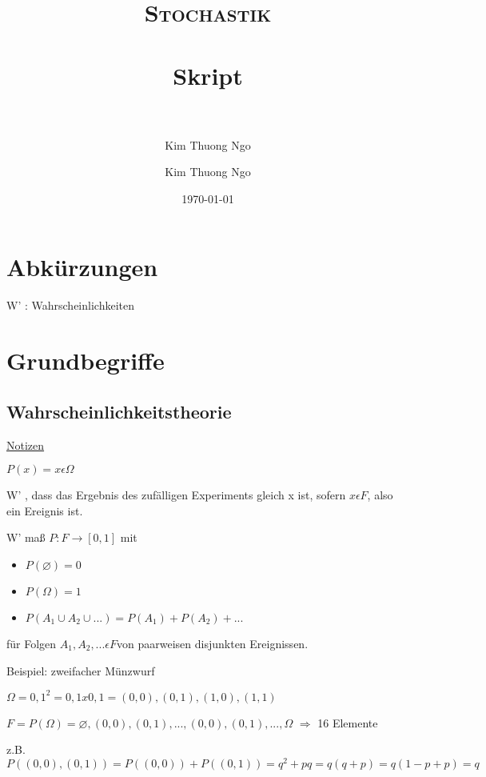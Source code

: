 \documentclass[paper=a4, fontsize=11pt]{scrartcl}
\author{Kim Thuong Ngo}
\title{	
\normalfont \normalsize 
\textsc{Stochastik} \\ [25pt] 
\horrule{0.5pt} \\[0.4cm] 
\huge Skript \\ 
\horrule{2pt} \\[0.5cm] 
}
\author{Kim Thuong Ngo}
\date{\normalsize\today}
\numberwithin{equation}{section}
\numberwithin{figure}{section}
\numberwithin{table}{section}
\begin{document}
\maketitle 

\newpage

\tableofcontents

\newpage


\section{Abkürzungen}

W' : Wahrscheinlichkeiten


\section{Grundbegriffe}

\subsection{Wahrscheinlichkeitstheorie}

\underline{Notizen}

$P ({x}) = x \epsilon \Omega $

W' , dass das Ergebnis des zufälligen Experiments gleich x ist, sofern ${x} \epsilon F$, also ein Ereignis ist.

W' maß $P: F \rightarrow [0,1]$ mit 
\begin{itemize}
\item $P( \varnothing ) = 0$
\item $P( \Omega ) = 1$
\item $P(A_{1} \cup A_{2} \cup ... ) = P(A_{1})+P(A_{2})+... $
\end{itemize}
für Folgen $A_{1}, A_{2},... \epsilon F$von paarweisen disjunkten Ereignissen.

Beispiel: zweifacher Münzwurf

$\Omega = {0,1} ^{2} = {0,1} x {0,1} = {(0,0),(0,1),(1,0),(1,1)}$

$F = P( \Omega ) = {\varnothing , {(0,0)}, {(0,1)}, ... , {(0,0),(0,1)}, ... , \Omega }$ $\Rightarrow$ 16 Elemente

z.B. $P({(0,0),(0,1)}) = P({(0,0)})+P({(0,1)}) = q^{2}+ pq = q (q+p) = q (1-p+p) = q $
\end{document}
